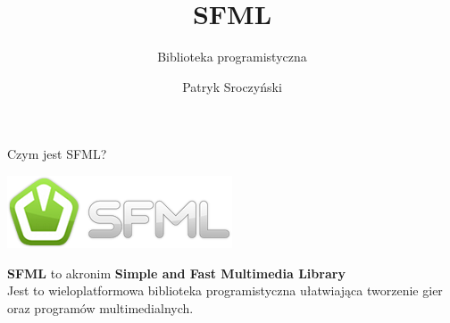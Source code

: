 \documentclass[12pt]{beamer}
\title{\Huge{SFML}}
\subtitle{Biblioteka programistyczna}
\author{Patryk Sroczyński}
\institute{\large\textbf{Politechnika Śląska} \\
    Gliwice}
\date{}
\begin{document}



    \begin{frame}

        \titlepage

    \end{frame}



    \begin{frame}[t]{Czym jest SFML?}\vspace{20pt}

        \begin{center}
            \includegraphics[scale=0.5]{textures/logo.png} \\[20pt]
        \end{center}
        

        \textbf{SFML} to akronim \textbf{Simple and Fast Multimedia Library} \\[20pt]

        Jest to wieloplatformowa biblioteka programistyczna ułatwiająca tworzenie gier
        oraz programów multimedialnych.

    \end{frame}
\end{document}
